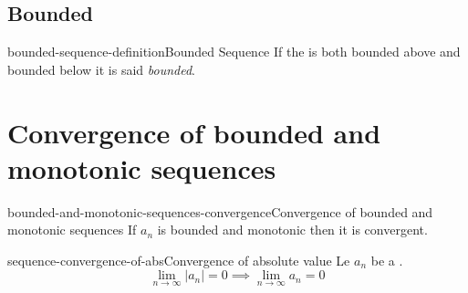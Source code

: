 \documentclass[preview]{standalone}
\begin{document}
\subsection{Bounded}

\begin{snippetdefinition}{bounded-sequence-definition}{Bounded Sequence}
    If the \sequence is both bounded above and bounded below it is
    said \textit{bounded}.
\end{snippetdefinition}

\section{Convergence of bounded and monotonic sequences}

\begin{snippettheorem}{bounded-and-monotonic-sequences-convergence}{Convergence of bounded and monotonic sequences}
    If \(a_n\) is bounded and monotonic then it is convergent.
\end{snippettheorem}

\begin{snippettheorem}{sequence-convergence-of-abs}{Convergence of absolute value}
    Le \(a_n\) be a \sequence.
    \[ \lim_{n\to\infty} |a_n| = 0 \implies \lim_{n\to\infty} a_n = 0 \]
\end{snippettheorem}

\end{document}
